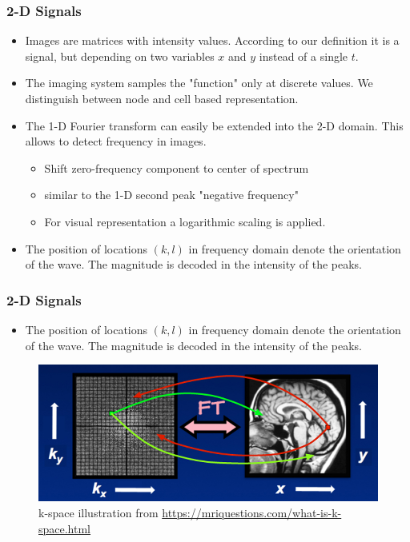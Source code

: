 \begin{frame}
\frametitle{2-D Signals}

\begin{itemize}
\item Images are matrices with intensity values. According to our definition it is a signal, but depending on two variables $x$ and $y$ instead of a single $t$.\newline
\item The imaging system samples the "function" only at discrete values. We distinguish between node and cell based representation.
\item The 1-D Fourier transform can easily be extended into the 2-D domain. This allows to detect frequency in images.
\begin{itemize}
\item Shift zero-frequency component to center of spectrum
\item similar to the 1-D second peak "negative frequency"
\item For visual representation a logarithmic scaling is applied.
\end{itemize}
\item The position of locations $(k,l)$ in frequency domain denote the orientation of the wave. The magnitude is decoded in the intensity of the peaks.
\end{itemize}
\end{frame}


\begin{frame}
\frametitle{2-D Signals}

\begin{itemize}
\item The position of locations $(k,l)$ in frequency domain denote the orientation of the wave. The magnitude is decoded in the intensity of the peaks.
\end{itemize}
\begin{figure}
    \includegraphics[height=.55\textheight ]{images/kspace-1.jpg} 
    \caption{k-space illustration from \url{https://mriquestions.com/what-is-k-space.html}}
\end{figure}
\end{frame}

